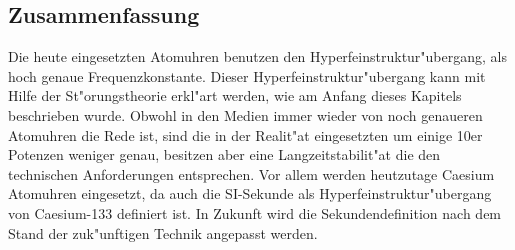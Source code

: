 \begin{refsection}
\section{Zusammenfassung}
Die heute eingesetzten Atomuhren benutzen den
Hyperfeinstruktur"ubergang, als hoch genaue Frequenzkonstante.  Dieser
Hyperfeinstruktur"ubergang kann mit Hilfe der St"orungstheorie
erkl"art werden, wie am Anfang dieses Kapitels beschrieben wurde.
Obwohl in den Medien immer wieder von noch genaueren Atomuhren die
Rede ist, sind die in der Realit"at eingesetzten um einige 10er
Potenzen weniger genau, besitzen aber eine Langzeitstabilit"at die den
technischen Anforderungen entsprechen.  Vor allem werden heutzutage
Caesium Atomuhren eingesetzt, da auch die SI-Sekunde als
Hyperfeinstruktur"ubergang von Caesium-133 definiert ist.  In Zukunft
wird die Sekundendefinition nach dem Stand der zuk"unftigen Technik
angepasst werden.

\printbibliography[heading=subbibliography]
\end{refsection}

